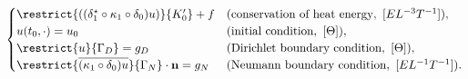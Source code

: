 \begin{formulation}
\begin{equation}
\begin{split}
\begin{cases}
        \restrict{((\delta_1^\star \circ \kappa_1 \circ \delta_0) u)}{K'_0} + f
        & (\text{conservation of heat energy},\ [E L^{-3} T^{-1}]), \\
%
        u(t_0, \cdot) = u_0
        & (\text{initial condition},\ [\Theta]), \\
%
        \restrict{u}{\Gamma_D} = g_D
        & (\text{Dirichlet boundary condition},\ [\Theta]), \\
%
        \restrict{\overline{(\kappa_1 \circ \delta_0) u}}{\Gamma_N}
        \cdot {\bf n} = g_N
        & (\text{Neumann boundary condition},\ [E L^{-1} T^{-1}]).
      \end{cases}
    \end{split}
  \end{equation}
\end{formulation}
